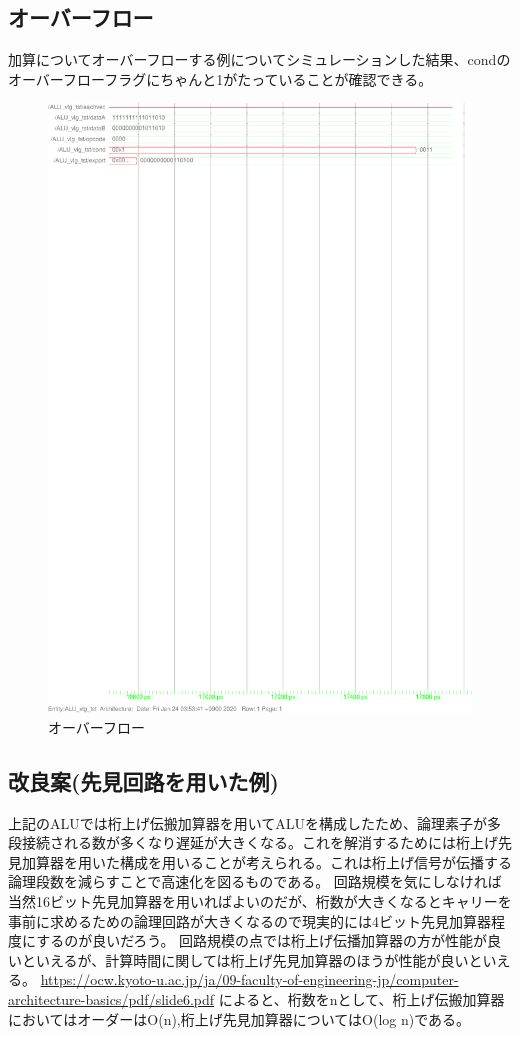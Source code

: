 \documentclass{jsarticle}
\begin{document}
\subsection{オーバーフロー}
加算についてオーバーフローする例についてシミュレーションした結果、condのオーバーフローフラグにちゃんと1がたっていることが確認できる。
\begin{figure}
    \caption{オーバーフロー}
  \includegraphics[scale=0.8]{ALU_ovf.ps}
\end{figure}

\subsection{改良案(先見回路を用いた例)}
上記のALUでは桁上げ伝搬加算器を用いてALUを構成したため、論理素子が多段接続される数が多くなり遅延が大きくなる。これを解消するためには桁上げ先見加算器を用いた構成を用いることが考えられる。これは桁上げ信号が伝播する論理段数を減らすことで高速化を図るものである。
回路規模を気にしなければ当然16ビット先見加算器を用いればよいのだが、桁数が大きくなるとキャリーを事前に求めるための論理回路が大きくなるので現実的には4ビット先見加算器程度にするのが良いだろう。
回路規模の点では桁上げ伝播加算器の方が性能が良いといえるが、計算時間に関しては桁上げ先見加算器のほうが性能が良いといえる。
\url{https://ocw.kyoto-u.ac.jp/ja/09-faculty-of-engineering-jp/computer-architecture-basics/pdf/slide6.pdf}
によると、桁数をnとして、桁上げ伝搬加算器においてはオーダーはO(n),桁上げ先見加算器についてはO(log n)である。
\end{document}

